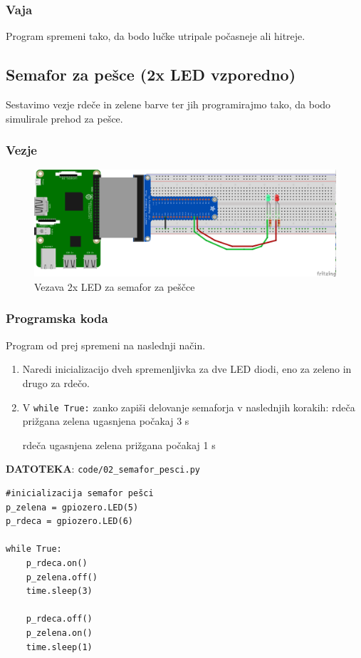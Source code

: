 \documentclass[11pt]{article}
\begin{document}
\subsubsection{Vaja}
\label{sec:org0a7136d}
Program spremeni tako, da bodo lučke utripale počasneje ali hitreje. 

\subsection{Semafor za pešce (2x LED vzporedno)}
\label{sec:org4e06ec3}
Sestavimo vezje rdeče in zelene barve ter jih programirajmo tako, da bodo
simulirale prehod za pešce. 
\subsubsection{Vezje}
\label{sec:orge07d7f8}

\begin{figure}[htbp]
\centering
\includegraphics[width=.9\linewidth]{breadboard/REB_2LED_sem.png}
\caption{\label{fig:org878b012}
Vezava 2x LED za semafor za peščce}
\end{figure}

\subsubsection{Programska koda}
\label{sec:org7d24e99}
Program od prej spremeni na naslednji način. 
\begin{enumerate}
\item Naredi inicializacijo dveh spremenljivka za dve LED diodi, eno za zeleno
in drugo za rdečo.
\item V \texttt{while True:} zanko zapiši delovanje semaforja v naslednjih korakih: 
rdeča prižgana
zelena ugasnjena
počakaj 3 s

rdeča ugasnjena
zelena prižgana
počakaj 1 s
\end{enumerate}

\textbf{DATOTEKA}: \texttt{code/02\_semafor\_pesci.py}

\begin{verbatim}
#inicializacija semafor pešci
p_zelena = gpiozero.LED(5)
p_rdeca = gpiozero.LED(6)

while True:
    p_rdeca.on()
    p_zelena.off()
    time.sleep(3)

    p_rdeca.off()
    p_zelena.on()
    time.sleep(1)
\end{verbatim}
\end{document}
